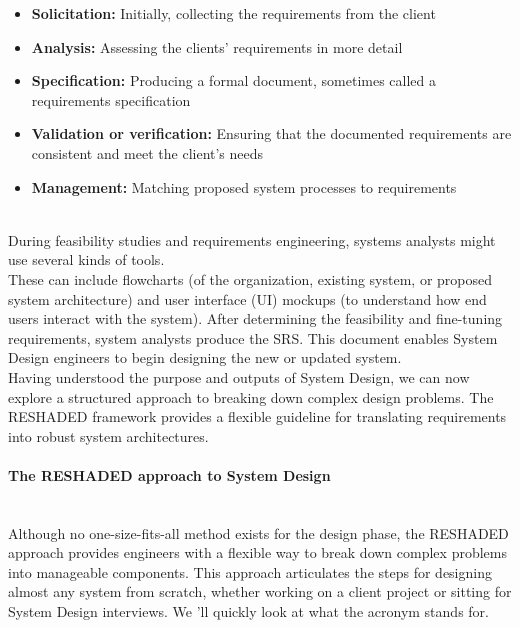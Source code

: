 \begin{itemize}
\item
\protect{}\label{2fFvMVOTlaV8jPB0KyWDw}
\textbf{Solicitation:} Initially, collecting the requirements from the client
\item
\protect{}\label{vrL1XZm8CFfQYcM96zzX7}
\textbf{Analysis:} Assessing the clients' requirements in more detail
\item
\protect{}\label{qkjSU7pja_IKsIkrI0zEB}
\textbf{Specification:} Producing a formal document, sometimes called a requirements specification
\item
\protect{}\label{wnlLL6m2Vk78hEmkdlVYA}
\textbf{Validation or verification:} Ensuring that the documented requirements are consistent and meet the client's needs
\item
\protect{}\label{XCMNRuOu6caciP-LTzQ1W}
\textbf{Management:} Matching proposed system processes to requirements
\end{itemize}
\\
During feasibility studies and requirements engineering, systems analysts might use several kinds of tools.
\\
These can include flowcharts (of the organization, existing system, or proposed system architecture) and user interface (UI) mockups (to understand how end users interact with the system). After determining the feasibility and fine-tuning requirements, system analysts produce the SRS. This document enables System Design engineers to begin designing the new or updated system.
\\
Having understood the purpose and outputs of System Design, we can now explore a structured approach to breaking down complex design problems. The RESHADED framework provides a flexible guideline for translating requirements into robust system architectures.
\\
\paragraph{The RESHADED approach to System Design}\label{QswfbJAOW7arxJ9KlCVXM}
\\
Although no one-size-fits-all method exists for the design phase, the RESHADED approach provides engineers with a flexible way to break down complex problems into manageable components. This approach articulates the steps for designing almost any system from scratch, whether working on a client project or sitting for System Design interviews. We 'll quickly look at what the acronym stands for.

